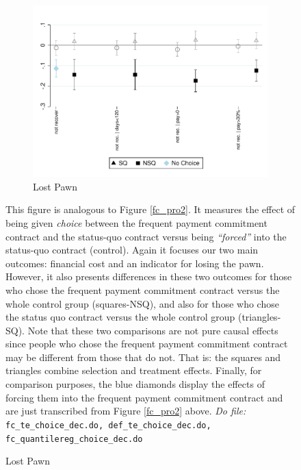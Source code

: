 \documentclass[11pt]{article}
\begin{document}
\begin{figure}[H]
\begin{center}
\begin{subfigure}{0.5\textwidth}
        \bigskip
        \bigskip
    
        \caption{Lost Pawn}
        \centering
        \includegraphics[width=\textwidth]{Figuras/def_te_pro_4.pdf}
    \end{subfigure}
    \end{center}
        \scriptsize
        This figure is analogous to Figure \ref{fc_pro2}. It measures the effect of being given \textit{choice} between the frequent payment commitment contract and the status-quo contract versus being \textit{``forced''} into the status-quo contract (control). Again it focuses our two main outcomes: financial cost and an indicator for losing the pawn. However, it also presents differences in these two outcomes for those who chose the frequent payment commitment contract versus the whole control group (squares-NSQ), and also for those who chose the status quo contract versus the whole control group (triangles-SQ). Note that these two comparisons are not pure causal effects since people who chose the frequent payment commitment contract may be different from those that do not. That is: the squares and triangles combine selection and treatment effects. Finally, for comparison purposes, the blue diamonds display the effects of forcing them into the frequent payment commitment contract and are just transcribed from Figure \ref{fc_pro2} above. 
      \textit{Do file: }  \texttt{fc\_te\_choice\_dec.do, def\_te\_choice\_dec.do, fc\_quantilereg\_choice\_dec.do}
\end{figure}
\end{document}
